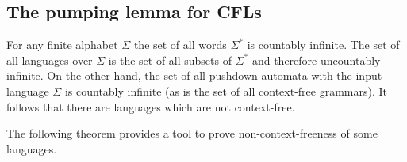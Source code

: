 

\setcounter{section}{7}
\setcounter{subsection}{2}
\setcounter{dfn}{2}

\subsection{The pumping lemma for CFLs}
For any finite alphabet $\Sigma$ the set of all words $\Sigma^*$ is countably infinite.
The set of all languages over $\Sigma$ is the set of all subsets of $\Sigma^*$ and therefore uncountably infinite.
On the other hand, the set of all pushdown automata with the input language $\Sigma$ is countably infinite
(as is the set of all context-free grammars).
It follows that there are languages which are not context-free.

The following theorem provides a tool to prove non-context-freeness of some languages.


